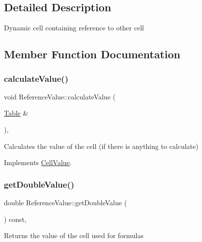 \subsection{Detailed Description}
Dynamic cell containing reference to other cell 

\subsection{Member Function Documentation}
\mbox{\label{classReferenceValue_a854b3c1368ad878010dd930307f9ccd2}} 
\subsubsection{\texorpdfstring{calculate\+Value()}{calculateValue()}}
{\footnotesize\ttfamily void Reference\+Value\+::calculate\+Value (\begin{DoxyParamCaption}\item[{\hyperlink{classTable}{Table} \&}]{ }\end{DoxyParamCaption})\hspace{0.3cm}{\ttfamily [override]}, {\ttfamily [virtual]}}

Calculates the value of the cell (if there is anything to calculate) 

Implements \hyperlink{classCellValue_ab644256decf3608ed50e389ead6cf611}{Cell\+Value}.

\mbox{\label{classReferenceValue_a1628a2c88bc97597b9f7e4f5b7a7a834}} 
\subsubsection{\texorpdfstring{get\+Double\+Value()}{getDoubleValue()}}
{\footnotesize\ttfamily double Reference\+Value\+::get\+Double\+Value (\begin{DoxyParamCaption}{ }\end{DoxyParamCaption}) const\hspace{0.3cm}{\ttfamily [override]}, {\ttfamily [virtual]}}

Returns the value of the cell used for formulas

